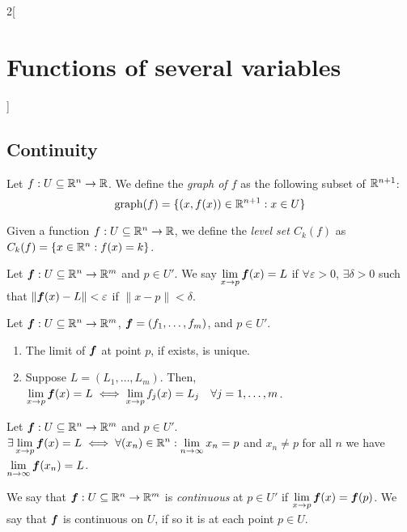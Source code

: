 \documentclass[../../../main.tex]{subfiles}
\begin{document}
\begin{multicols}{2}[\section{Functions of several variables}]
  \subsection{Continuity}
  \begin{definition}
    Let $f:U\subseteq\mathbb{R}^n\rightarrow\mathbb{R} $. We define the \textit{graph of $f$} as the following subset of $\mathbb{R}^{n+1}$: $$\text{graph}(f)=\{(x,f(x))\in\mathbb{R}^{n+1}:x\in U\}$$
  \end{definition}
  \begin{definition}
    Given a function $f:U\subseteq\mathbb{R}^n\rightarrow\mathbb{R} $, we define the \textit{level set $C_k(f)$} as $C_k(f)=\{x\in\mathbb{R}^n:f(x)=k\}$.
  \end{definition}
  \begin{definition}
    Let $\boldsymbol{f}:U\subseteq\mathbb{R}^n\rightarrow\mathbb{R}^m$ and $p\in U'$. We say $\displaystyle\lim_{x\to p}\boldsymbol{f}(x)=L$ if $\forall\varepsilon>0$, $\exists\delta>0$ such that $\|\mathbf{\boldsymbol{f}}(x)-L\|<\varepsilon$ if $\|x-p\|<\delta$.
  \end{definition}
  \begin{prop}
    Let $\mathbf{\boldsymbol{f}}:U\subseteq\mathbb{R}^n\rightarrow\mathbb{R}^m$, $\mathbf{\boldsymbol{f}}=(f_1,\ldots,f_m)$, and $p\in U'$.
    \begin{enumerate}
      \item The limit of $\mathbf{\boldsymbol{f}}$ at point $p$, if exists, is unique.
      \item Suppose $L=(L_1,\ldots,L_m)$. Then, $\displaystyle\lim_{x\to p}\mathbf{\boldsymbol{f}}(x)=L\iff\lim_{x\to p}f_j(x)=L_j\quad\forall j=1,\ldots,m$.
    \end{enumerate}
  \end{prop}
  \begin{lemma}
    Let $\mathbf{\boldsymbol{f}}:U\subseteq\mathbb{R}^n\rightarrow\mathbb{R}^m$ and $p\in U'$. $\displaystyle\exists\lim_{x\to p}\mathbf{\boldsymbol{f}}(x)=L\iff\forall(x_n)\in\mathbb{R}^n:\lim_{n\to\infty}x_n=p$ and $x_n\ne p$ for all $n$ we have $\displaystyle\lim_{n\to \infty}\mathbf{\boldsymbol{f}}(x_n)=L$.
  \end{lemma}
  \begin{definition}
    We say that $\mathbf{\boldsymbol{f}}:U\subseteq\mathbb{R}^n\rightarrow\mathbb{R}^m$ is \textit{continuous} at $p\in U'$ if $\displaystyle\lim_{x\to p}\mathbf{\boldsymbol{f}}(x)=\mathbf{\boldsymbol{f}}(p)$. We say that $\mathbf{\boldsymbol{f}}$ is continuous on $U$, if so it is at each point $p\in U$.

\end{definition}
\end{multicols}
\end{document}
